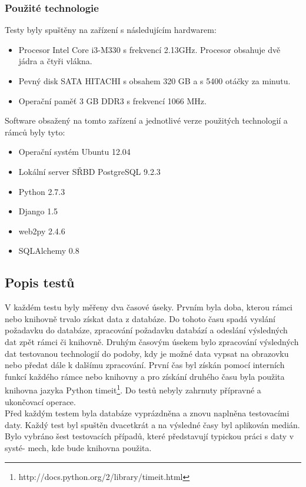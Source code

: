 \documentclass[ing,male,java,dept456]{diploma}						%
\begin{document}
\subsubsection{Použité technologie}
Testy byly spuštěny na zařízení s následujícím hardwarem:
\begin{itemize}
\item Procesor Intel Core i3-M330 s frekvencí 2.13GHz. Procesor obsahuje dvě jádra a čtyři vlákna.
\item Pevný disk SATA HITACHI s obsahem 320 GB a s 5400 otáčky za minutu.
\item Operační paměť 3 GB DDR3 s frekvencí 1066 MHz.
\end{itemize}
Software obsažený na tomto zařízení a jednotlivé verze použitých technologií a rámců byly tyto:
\begin{itemize}
\item Operační systém Ubuntu 12.04
\item Lokální server SŘBD PostgreSQL 9.2.3
\item Python 2.7.3
\item Django 1.5
\item web2py 2.4.6
\item SQLAlchemy 0.8
\end{itemize}

\subsection{Popis testů}
V každém testu byly měřeny dva časové úseky. Prvním byla doba, kterou rámci nebo knihovně trvalo získat data z databáze. Do tohoto času spadá vyslání požadavku do databáze, zpracování požadavku databází a odeslání výsledných dat zpět rámci či knihovně. Druhým časovým úsekem bylo zpracování výsledných dat testovanou technologií do podoby, kdy je možné data vypsat na obrazovku nebo předat dále k dalšímu zpracování. První čas byl získán pomocí interních funkcí každého rámce nebo knihovny a pro získání druhého času byla použita knihovna jazyka Python timeit\footnote{http://docs.python.org/2/library/timeit.html}. Do testů nebyly zahrnuty přípravné a ukončovací operace. \\
Před každým testem byla databáze vyprázdněna a znovu naplněna testovacími daty. Každý test byl spuštěn dvacetkrát a na výsledné časy byl aplikován medián. \\
Bylo vybráno šest testovacích případů, které představují typickou práci s daty v systé-
mech, kde bude knihovna použita.
\end{document}
